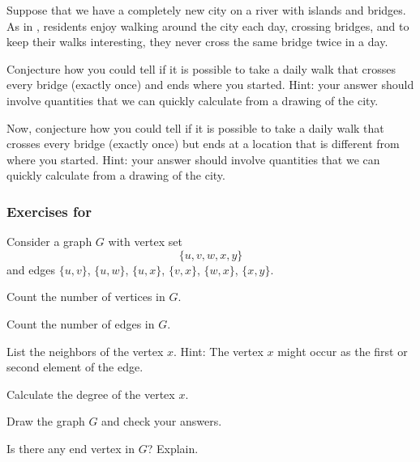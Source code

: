 \begin{exer}[\exerE] %
\label{exer_bridges_conj}
    Suppose that we have a completely new city on a river with islands and bridges.  As in , residents enjoy walking around the city each day, crossing bridges, and to keep their walks interesting, they never cross the same bridge twice in a day.
        \begin{exerpart}
            \item Conjecture how you could tell if it is possible to take a daily walk that crosses every bridge (exactly once) and ends where you started.  Hint: your answer should involve quantities that we can quickly calculate from a drawing of the city. 
            \item Now, conjecture how you could tell if it is possible to take a daily walk that crosses every bridge (exactly once) but ends at a location that is different from where you started.  Hint: your answer should involve quantities that we can quickly calculate from a drawing of the city.
        \end{exerpart} 
\end{exer}


\subsubsection*{Exercises for  \subdefngraph}

\begin{exer}[\exerP] %
\label{exer_my_first_graph}
    Consider a graph $G$ with vertex set 
        $$\{u, v, w, x, y\}$$ 
    and edges $\{u,v\}$, $\{u,w\}$, $\{u,x\}$, $\{v,x\}$, $\{w,x\}$, $\{x,y\}$.
        \begin{exerpart}
            \item Count the number of vertices in $G$.
            \item Count the number of edges in $G$.
            \item List the neighbors of the vertex $x$. Hint: The vertex $x$ might occur as the first or second element of the edge.
            \item Calculate the degree of the vertex $x$.  
            \item Draw the graph $G$ and check your answers.
            \item Is there any end vertex in $G$? Explain.
        \end{exerpart}
\end{exer}

